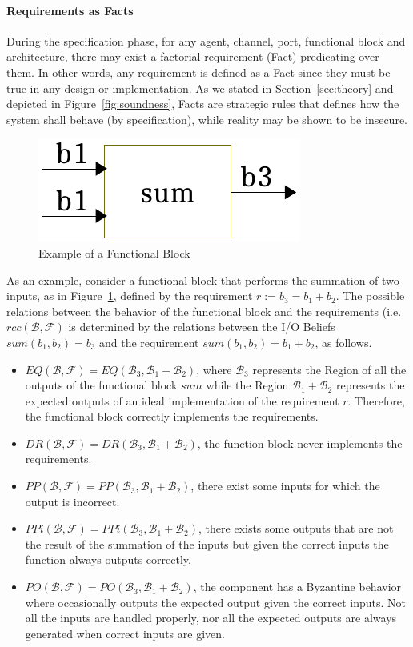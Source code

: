 \documentclass[conference]{IEEEtran}
\newcommand{\beliefRegion}{\mathcal{B}}
\newcommand{\factRegion}{\mathcal{F}}
\newcommand{\Rcc}[2]{rcc(#1,#2)}
\newcommand{\eq}[2]{EQ(#1,#2)}
\newcommand{\pp}[2]{PP(#1,#2)}
\newcommand{\po}[2]{PO(#1,#2)}
\newcommand{\ppi}[2]{PPi(#1,#2)}
\newcommand{\dr}[2]{DR(#1,#2)}
\begin{document}
\paragraph{Requirements as Facts}
During the specification phase, for any agent, channel, port, functional block
and architecture, there may exist a factorial requirement (Fact) predicating over them.
In other words, any requirement is defined as a Fact since they must be true in
any design or implementation. As we stated in Section~\ref{sec:theory} and depicted in
Figure~\ref{fig:soundness}, Facts are strategic rules that defines how
the system shall behave (by specification), while reality may be shown to
be insecure.

\begin{figure}[t]
	\centering
	\includegraphics[width=0.4\columnwidth]{sum.pdf}
	\caption{Example of a Functional Block}
	\label{fig:sum}
\end{figure}

As an example, consider a functional block that performs the summation of two
inputs, as in Figure~\ref{fig:sum}, defined by the requirement $r := b_3 = b_1
+ b_2$. The possible relations between the behavior of the functional block and
the requirements (i.e. $\Rcc{\beliefRegion}{\factRegion}$ is determined by
the relations between the I/O Beliefs $sum(b_1,b_2)=b_3$ and the requirement
$sum(b_1,b_2)=b_1+b_2$, as follows.
\begin{itemize}
	\item $\eq{\beliefRegion}{\factRegion}=\eq{\beliefRegion_3}{\beliefRegion_1+\beliefRegion_2}$, 
		where $\beliefRegion_3$ represents the Region of all the
		outputs of the functional block $sum$ while the Region
		$\beliefRegion_1+\beliefRegion_2$ represents the expected
		outputs of an ideal implementation of the requirement $r$.
		Therefore, the functional block correctly implements the
		requirements.
	\item
		$\dr{\beliefRegion}{\factRegion}=\dr{\beliefRegion_3}{\beliefRegion_1+\beliefRegion_2}$,
		the function block never implements the requirements.
	\item
		$\pp{\beliefRegion}{\factRegion}=\pp{\beliefRegion_3}{\beliefRegion_1+\beliefRegion_2}$, there exist some inputs for which
		the output is incorrect.
	\item $\ppi{\beliefRegion}{\factRegion}=\ppi{\beliefRegion_3}{\beliefRegion_1+\beliefRegion_2}$, there exists some outputs that are not the result of the summation of the inputs but given the correct inputs the function always outputs correctly.
	\item
		$\po{\beliefRegion}{\factRegion}=\po{\beliefRegion_3}{\beliefRegion_1+\beliefRegion_2}$,
		the component has a Byzantine behavior where occasionally
		outputs the expected output given the correct inputs. Not all
		the inputs are handled properly, nor all the expected outputs
		are always generated when correct inputs are given.
\end{itemize}
\end{document}
